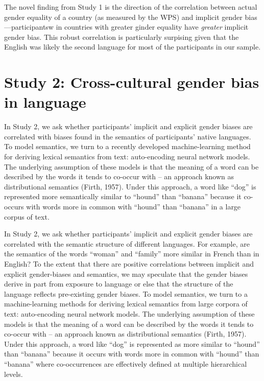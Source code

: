 \documentclass[10pt, letterpaper]{article}
\begin{document}
The novel finding from Study 1 is the direction of the correlation
between actual gender equality of a country (as measured by the WPS) and
implicit gender bias---participantsw in countries with greater ginder
equality have \emph{greater} implicit gender bias. This robust
correlation is particularly surpising given that the English was likely
the second language for most of the participants in our sample.

\section{Study 2: Cross-cultural gender bias in
language}\label{study-2-cross-cultural-gender-bias-in-language}

In Study 2, we ask whether participants' implicit and explicit gender
biases are correlated with biases found in the semantics of
participants' native languages. To model semantics, we turn to a
recently developed machine-learning method for deriving lexical
semantics from text: auto-encoding neural network models. The underlying
assumption of these models is that the meaning of a word can be
described by the words it tends to co-occur with -- an approach known as
distributional semantics (Firth, 1957). Under this approach, a word like
``dog'' is represented more semantically similar to ``hound'' than
``banana'' because it co-occurs with words more in common with ``hound''
than ``banana'' in a large corpus of text.

In Study 2, we ask whether participants' implicit and explicit gender
biases are correlated with the semantic structure of different
languages. For example, are the semantics of the words ``woman'' and
``family'' more similar in French than in English? To the extent that
there are positive correlations between implicit and explicit
gender-biases and semantics, we may speculate that the gender biases
derive in part from exposure to language or else that the structure of
the language reflects pre-existing gender biases. To model semantics, we
turn to a machine-learning methods for deriving lexical semantics from
large corpora of text: auto-encoding neural network models. The
underlying assumption of these models is that the meaning of a word can
be described by the words it tends to co-occur with -- an approach known
as distributional semantics (Firth, 1957). Under this approach, a word
like ``dog'' is represented as more similar to ``hound'' than ``banana''
because it occurs with words more in common with ``hound'' than
``banana'' where co-occurrences are effectively defined at multiple
hierarchical levels.
\end{document}
